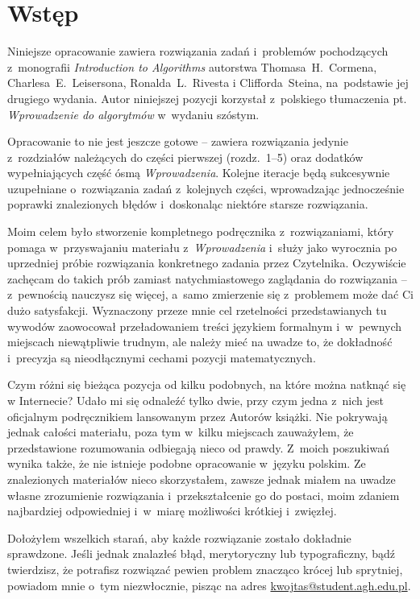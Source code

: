 \chapter{Wstęp}

Niniejsze opracowanie zawiera rozwiązania zadań i~problemów pochodzących z~monografii \textsl{Introduction to Algorithms} \cite{cormen} autorstwa Thomasa~H.~Cormena, Charlesa~E.~Leisersona, Ronalda~L.~Rivesta i Clifforda~Steina, na~podstawie jej drugiego wydania. Autor niniejszej pozycji korzystał z~polskiego tłumaczenia pt. \textsl{Wprowadzenie do algorytmów} \cite{cormenpl} w~wydaniu szóstym.

Opracowanie to nie jest jeszcze gotowe -- zawiera rozwiązania jedynie z~rozdziałów należących do części pierwszej (rozdz.~1\nobreakdash--5) oraz dodatków wypełniających część ósmą \textsl{Wprowadzenia}. Kolejne iteracje będą sukcesywnie uzupełniane o~rozwiązania zadań z~kolejnych części, wprowadzając jednocześnie poprawki znalezionych błędów i~doskonaląc niektóre starsze rozwiązania.

Moim celem było stworzenie kompletnego podręcznika z~rozwiązaniami, który pomaga w~przyswajaniu materiału z~\textsl{Wprowadzenia} i~służy jako wyrocznia po uprzedniej próbie rozwiązania konkretnego zadania przez Czytelnika. Oczywiście zachęcam do takich prób zamiast natychmiastowego zaglądania do rozwiązania -- z~pewnością nauczysz się więcej, a~samo zmierzenie się z~problemem może dać Ci dużo satysfakcji. Wyznaczony przeze mnie cel rzetelności przedstawianych tu wywodów zaowocował przeładowaniem treści językiem formalnym i~w~pewnych miejscach niewątpliwie trudnym, ale należy mieć na uwadze to, że dokładność i~precyzja są nieodłącznymi cechami pozycji matematycznych.

Czym różni się bieżąca pozycja od kilku podobnych, na które można natknąć się w Internecie? Udało mi się odnaleźć tylko dwie, przy czym jedna z~nich jest oficjalnym podręcznikiem lansowanym przez Autorów książki. Nie pokrywają jednak całości materiału, poza tym w~kilku miejscach zauważyłem, że przedstawione rozumowania odbiegają nieco od prawdy. Z~moich poszukiwań wynika także, że nie istnieje podobne opracowanie w~języku polskim. Ze znalezionych materiałów nieco skorzystałem, zawsze jednak miałem na uwadze własne zrozumienie rozwiązania i~przekształcenie go do postaci, moim zdaniem najbardziej odpowiedniej i~w~miarę możliwości krótkiej i~zwięzłej.

Dołożyłem wszelkich starań, aby każde rozwiązanie zostało dokładnie sprawdzone. Jeśli jednak znalazłeś błąd, merytoryczny lub typograficzny, bądź twierdzisz, że potrafisz rozwiązać pewien problem znacząco krócej lub sprytniej, powiadom mnie o~tym niezwłocznie, pisząc na adres \url{kwojtas@student.agh.edu.pl}.

